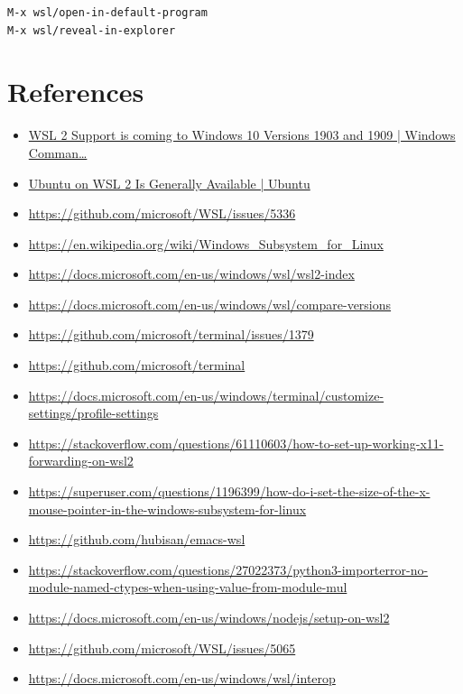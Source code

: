 \documentclass[10pt]{article}
\begin{document}
\begin{verbatim}
M-x wsl/open-in-default-program
M-x wsl/reveal-in-explorer
\end{verbatim}


\section{References}
\label{sec:org75264a1}
\begin{itemize}
\item \href{https://devblogs.microsoft.com/commandline/wsl-2-support-is-coming-to-windows-10-versions-1903-and-1909/}{WSL 2 Support is coming to Windows 10 Versions 1903 and 1909 | Windows Comman\ldots{}}
\item \href{https://ubuntu.com/blog/ubuntu-on-wsl-2-is-generally-available}{Ubuntu on WSL 2 Is Generally Available | Ubuntu}
\item \url{https://github.com/microsoft/WSL/issues/5336}
\item \url{https://en.wikipedia.org/wiki/Windows\_Subsystem\_for\_Linux}
\item \url{https://docs.microsoft.com/en-us/windows/wsl/wsl2-index}
\item \url{https://docs.microsoft.com/en-us/windows/wsl/compare-versions}
\item \url{https://github.com/microsoft/terminal/issues/1379}
\item \url{https://github.com/microsoft/terminal}
\item \url{https://docs.microsoft.com/en-us/windows/terminal/customize-settings/profile-settings}
\item \url{https://stackoverflow.com/questions/61110603/how-to-set-up-working-x11-forwarding-on-wsl2}
\item \url{https://superuser.com/questions/1196399/how-do-i-set-the-size-of-the-x-mouse-pointer-in-the-windows-subsystem-for-linux}
\item \url{https://github.com/hubisan/emacs-wsl}
\item \url{https://stackoverflow.com/questions/27022373/python3-importerror-no-module-named-ctypes-when-using-value-from-module-mul}
\item \url{https://docs.microsoft.com/en-us/windows/nodejs/setup-on-wsl2}
\item \url{https://github.com/microsoft/WSL/issues/5065}
\item \url{https://docs.microsoft.com/en-us/windows/wsl/interop}
\end{itemize}

\singlespacing
\end{document}
